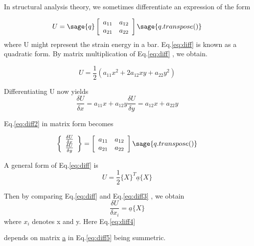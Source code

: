 \documentclass[12pt]{report}
\newcommand{\lab}[1]{
	Eq.\ref{#1}
}
\begin{document}
In structural analysis theory, 
we sometimes differentiate an expression of the form 

\begin{equation}
	U =\sage{q}\left[\begin{array}{rr}a_{11} & a_{12}\\
	a_{21} & a_{22}\\ 
	\end{array}\right]\sage{q.transpose()}
\label{eq:diff}
\end{equation}
where U might represent the strain energy in 
a bar.\lab{eq:diff} is known as a quadratic 
form. By matrix multiplication of \lab{eq:diff}, 
we obtain.

\begin{equation} 
	U = \frac{1}{2}(a_{{11}}x^2 +2a_{{12}}xy + a_{{22}}y^2)
\end{equation}

Differentiating U now yields 
\begin{equation} 
	\frac{\delta U}{\delta x} = a_{{11}}x + a_{{12}}y  \frac{\delta U}{\delta y} = a_{{12}}x + a_{{22}}y 
	\label{eq:diff2}
	\end{equation} 
	\lab{eq:diff2} in matrix form becomes

\begin{equation}
	\left\{\begin{array}{rr} \frac{\delta U}{\delta x} \\
	\frac{\delta U}{\delta y} \\ 
	\end{array}\right\} = \left[\begin{array}{rr}a_{11} & a_{12} \\
	a_{21} & a_{22}\\ 
	\end{array}\right] \sage{q.transpose()}\label{eq:diff3}
\end{equation}

A general form of \lab{eq:diff} is 
\begin{equation} 
	U = \frac{1}{2}\{X\}^T\underline{a}\{X\}
	\label{eq:diff5}
\end{equation}

Then by comparing \lab{eq:diff} and \lab{eq:diff3}, we obtain 
\begin{equation}
	\frac{ \delta U}{\delta x_{i}} = \underline{a}\{X\}
	\label{eq:diff4}
\end{equation}
where $x_{i}$ denotes x and y. Here \lab{eq:diff4} 
depends on matrix \underline{a} in \lab{eq:diff5}being summetric.
\end{document}
